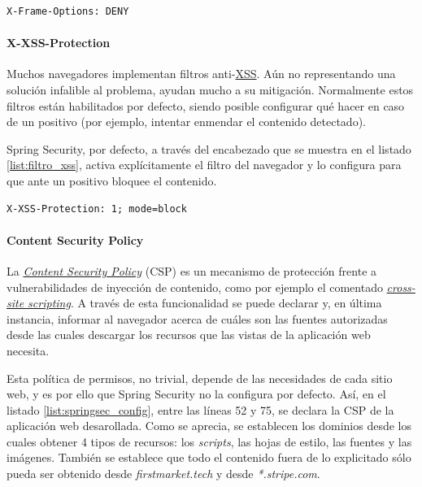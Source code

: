 \documentclass[a4paper]{article}
\begin{document}
	\begin{lstlisting}[caption=Cabecera que inhibe el uso de las etiquetas \emph{iframe}, label=list:iframe]
	 X-Frame-Options: DENY
	\end{lstlisting}
	
	\paragraph{X-XSS-Protection}
	Muchos navegadores implementan filtros anti-\href{https://owasp.org/www-community/attacks/xss/}{XSS}. Aún no representando una solución infalible al problema, ayudan mucho a su mitigación. Normalmente estos filtros están habilitados por defecto, siendo posible configurar qué hacer en caso de un positivo (por ejemplo, intentar enmendar el contenido detectado).
	
	Spring Security, por defecto, a través del encabezado que se muestra en el listado \ref{list:filtro_xss}, activa explícitamente el filtro del navegador y lo configura para que ante un positivo bloquee el contenido.
	\\
	
	\begin{lstlisting}[caption=Cabecera que activa y configura el filtro anti-XSS del navegador, label=list:filtro_xss]
	X-XSS-Protection: 1; mode=block
	\end{lstlisting}
	
	\paragraph{Content Security Policy}
	La \href{https://developer.mozilla.org/en-US/docs/Web/HTTP/CSP}{\emph{Content Security Policy}} (CSP) es un mecanismo de protección frente a vulnerabilidades de inyección de contenido, como por ejemplo el comentado \href{https://owasp.org/www-community/attacks/xss/}{\emph{cross-site scripting}}. A través de esta funcionalidad se puede declarar y, en última instancia, informar al navegador acerca de cuáles son las fuentes autorizadas desde las cuales descargar los recursos que las vistas de la aplicación web necesita.
	
	Esta política de permisos, no trivial, depende de las necesidades de cada sitio web, y es por ello que Spring Security no la configura por defecto. Así, en el listado \ref{list:springsec_config}, entre las líneas 52 y 75, se declara la CSP de la aplicación web desarollada. Como se aprecia, se establecen los dominios desde los cuales obtener 4 tipos de recursos: los \emph{scripts}, las hojas de estilo, las fuentes y las imágenes. También se establece que todo el contenido fuera de lo explicitado sólo pueda ser obtenido desde \emph{firstmarket.tech} y desde \emph{*.stripe.com}.
	
\end{document}
